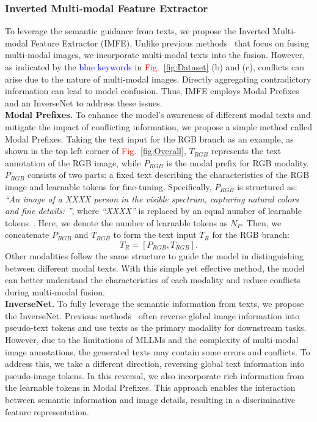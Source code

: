\subsubsection{Inverted Multi-modal Feature Extractor}
To leverage the semantic guidance from texts, we propose the Inverted Multi-modal Feature Extractor (IMFE).
%
Unlike previous methods~\cite{wang2024top,zhang2024magic} that focus on fusing multi-modal images, we incorporate multi-modal texts into the fusion.
%
However, as indicated by the \textcolor{blue}{blue keywords} in \textcolor{red}{Fig.}~\ref{fig:Dataset} (b) and (c), conflicts can arise due to the nature of multi-modal images.
%
Directly aggregating contradictory information can lead to model confusion.
%
Thus, IMFE employs Modal Prefixes and an InverseNet to address these issues.\\
\textbf{Modal Prefixes.}
To enhance the model’s awareness of different modal texts and mitigate the impact of conflicting information, we propose a simple method called Modal Prefixes.
%
Taking the text input for the RGB branch as an example, as shown in the top left corner of \textcolor{red}{Fig.}~\ref{fig:Overall}, $T_{RGB}$ represents the text annotation of the RGB image, while $P_{RGB}$ is the modal prefix for RGB modality.
%
$P_{RGB}$ consists of two parts: a fixed text describing the characteristics of the RGB image and learnable tokens for fine-tuning.
%
Specifically, $P_{RGB}$ is structured as: \textit{“An image of a XXXX person in the visible spectrum, capturing natural colors and fine details: ”}, where \textit{“XXXX”} is replaced by an equal number of learnable tokens~\cite{li2023clip}.
%
Here, we denote the number of learnable tokens as $N_{P}$.
%
Then, we concatenate $P_{RGB}$ and $T_{RGB}$ to form the text input $T_{R}$ for the RGB branch:
\begin{equation}
    T_{R} = [P_{RGB}, T_{RGB}].
\end{equation}
Other modalities follow the same structure to guide the model in distinguishing between different modal texts.
%
With this simple yet effective method, the model can better understand the characteristics of each modality and reduce conflicts during multi-modal fusion.
\\
\textbf{InverseNet.}
To fully leverage the semantic information from texts, we propose the InverseNet.
%
Previous methods~\cite{baldrati2023zero,han2024clip} often reverse global image information into pseudo-text tokens and use texts as the primary modality for downstream tasks.
%
However, due to the limitations of MLLMs and the complexity of multi-modal image annotations, the generated texts may contain some errors and conflicts.
%
To address this, we take a different direction, reversing global text information into pseudo-image tokens.
%
In this reversal, we also incorporate rich information from the learnable tokens in Modal Prefixes.
%
This approach enables the interaction between semantic information and image details, resulting in a discriminative feature representation.
%

